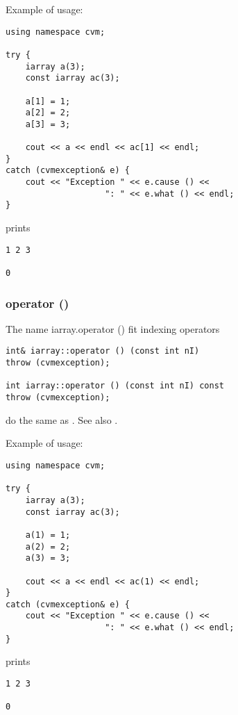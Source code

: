 Example of usage:
\begin{verbatim}
using namespace cvm;

try {
    iarray a(3);
    const iarray ac(3);

    a[1] = 1;
    a[2] = 2;
    a[3] = 3;

    cout << a << endl << ac[1] << endl;
}
catch (cvmexception& e) {
    cout << "Exception " << e.cause () <<
                    ": " << e.what () << endl;
}
\end{verbatim}
prints
\begin{verbatim}
1 2 3

0
\end{verbatim}
\newpage




\subsubsection{operator ()}
The%
\pdfdest name {iarray.operator ()} fit
indexing operators
\begin{verbatim}
int& iarray::operator () (const int nI)
throw (cvmexception);

int iarray::operator () (const int nI) const
throw (cvmexception);
\end{verbatim}
do the same as .
See also .

Example of usage:
\begin{verbatim}
using namespace cvm;

try {
    iarray a(3);
    const iarray ac(3);

    a(1) = 1;
    a(2) = 2;
    a(3) = 3;

    cout << a << endl << ac(1) << endl;
}
catch (cvmexception& e) {
    cout << "Exception " << e.cause () <<
                    ": " << e.what () << endl;
}
\end{verbatim}
prints
\begin{verbatim}
1 2 3

0
\end{verbatim}
\newpage


